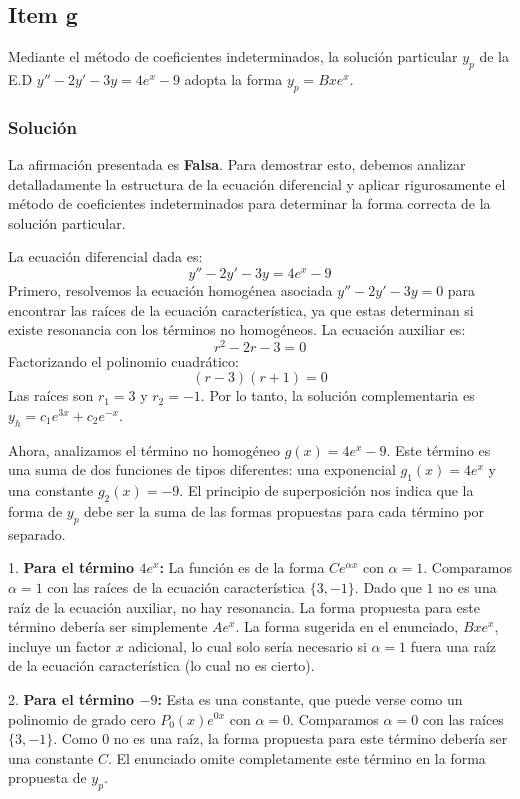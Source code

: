 \documentclass[a4paper]{article}
\begin{document}
\subsection{Item g}
Mediante el método de coeficientes indeterminados, la solución particular $y_p$ de la E.D $y'' - 2y' - 3y = 4e^x - 9$ adopta la forma $y_p = Bxe^x$.

\subsubsection{Solución}
La afirmación presentada es \textbf{Falsa}. Para demostrar esto, debemos analizar detalladamente la estructura de la ecuación diferencial y aplicar rigurosamente el método de coeficientes indeterminados para determinar la forma correcta de la solución particular.

La ecuación diferencial dada es:
$$
y'' - 2y' - 3y = 4e^x - 9
$$
Primero, resolvemos la ecuación homogénea asociada $y'' - 2y' - 3y = 0$ para encontrar las raíces de la ecuación característica, ya que estas determinan si existe resonancia con los términos no homogéneos. La ecuación auxiliar es:
$$
r^2 - 2r - 3 = 0
$$
Factorizando el polinomio cuadrático:
$$
(r - 3)(r + 1) = 0
$$
Las raíces son $r_1 = 3$ y $r_2 = -1$. Por lo tanto, la solución complementaria es $y_h = c_1 e^{3x} + c_2 e^{-x}$.

Ahora, analizamos el término no homogéneo $g(x) = 4e^x - 9$. Este término es una suma de dos funciones de tipos diferentes: una exponencial $g_1(x) = 4e^x$ y una constante $g_2(x) = -9$. El principio de superposición nos indica que la forma de $y_p$ debe ser la suma de las formas propuestas para cada término por separado.

1.  \textbf{Para el término $4e^x$:} La función es de la forma $Ce^{\alpha x}$ con $\alpha = 1$. Comparamos $\alpha = 1$ con las raíces de la ecuación característica $\{3, -1\}$. Dado que $1$ no es una raíz de la ecuación auxiliar, no hay resonancia. La forma propuesta para este término debería ser simplemente $A e^x$. La forma sugerida en el enunciado, $Bxe^x$, incluye un factor $x$ adicional, lo cual solo sería necesario si $\alpha = 1$ fuera una raíz de la ecuación característica (lo cual no es cierto).

2.  \textbf{Para el término $-9$:} Esta es una constante, que puede verse como un polinomio de grado cero $P_0(x)e^{0x}$ con $\alpha = 0$. Comparamos $\alpha = 0$ con las raíces $\{3, -1\}$. Como $0$ no es una raíz, la forma propuesta para este término debería ser una constante $C$. El enunciado omite completamente este término en la forma propuesta de $y_p$.
\end{document}
